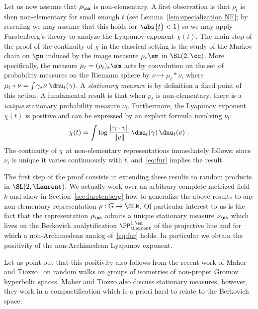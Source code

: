 Let us now assume that $\rho_\na$ is non-elementary. A first observation is that $\rho_t$ is then non-elementary for small enough $t$ (see Lemma~\ref{lem:specialization NE}; by rescaling we may assume that this holds for $\abs{t}<1$) so we may apply Furstenberg's theory to analyze the Lyapunov exponent $\chi(t)$. The main step of the proof of the continuity of $\chi$ in the classical setting is the study of the Markov chain on $\pu$ induced by the image measure $\rho_*\sm$ in $\SL(2,\cc)$. More specifically, the measure $\mu_t = (\rho_t)_* \sm$ acts by convolution on the set of probability measures on the Riemann sphere by $\nu \mapsto \mu_t \ast \nu$, where $\mu_t \ast \nu = \int \gamma_*\nu \; \dmu_t(\gamma)$. A \emph{stationary measure} is by definition a fixed point of this action. A fundamental result is that when $\rho_t$ is non-elementary, there is a \emph{unique} stationary probability measure $\nu_t$. Furthermore, the Lyapunov exponent $\chi(t)$ is positive and can be expressed by an explicit formula involving $\nu_t$:
\begin{equation}\label{eq:fur}
\chi(t) = \int \log \frac{\| \gamma \cdot v\|}{\|v \|} \, \dmu_t(\gamma)\, \dnu_t(v)~.
\end{equation}
The continuity of $\chi$ at non-elementary representations immediately follows: since $\nu_t$ is unique it varies continuously with $t$, and~\eqref{eq:fur} implies the result.


The first step of the proof consists in extending these results to random products in $\SL(2, \Laurent)$. We actually work over an arbitrary complete metrized field $k$ and show in Section~\ref{sec:furstenberg} how to generalize the above results to any non-elementary representation $\rho: G \to \SLk$. Of particular interest to us is the fact that the representation $\rho_\na$ admits a unique stationary measure $\nu_\na$ which lives on the Berkovich analytification $\PP^{1,\an}_{\Laurent}$ of the projective line and for which a non-Archimedean analog of~\eqref{eq:fur} holds. In particular we obtain the positivity of the non-Archimedean Lyapunov exponent.

Let us point out that this positivity also follows from the recent work of Maher and Tiozzo~\cite{maher-tiozzo} on random walks on groups of isometries of non-proper Gromov hyperbolic spaces. Maher and Tiozzo also discuss stationary measures, however, they work in a compactification which is a priori hard to relate to the Berkovich space.

